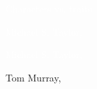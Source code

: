 \documentclass[t]{beamer}
\begin{document}
{
\begin{frame}[t,plain]{\textcolor{white}{Characters vs. traits}}

\vfilll

\tiny \textcolor{white}{Michael S. Taylor, }

\end{frame}
}
%
{
\begin{frame}[t,plain]

\vfilll

\tiny \textcolor{white}{Michael S. Taylor, }

\end{frame}
}
%
{
\begin{frame}[t,plain]

\vfilll

\hfill \tiny Tom Murray, 
\end{frame}
}
\end{document}

